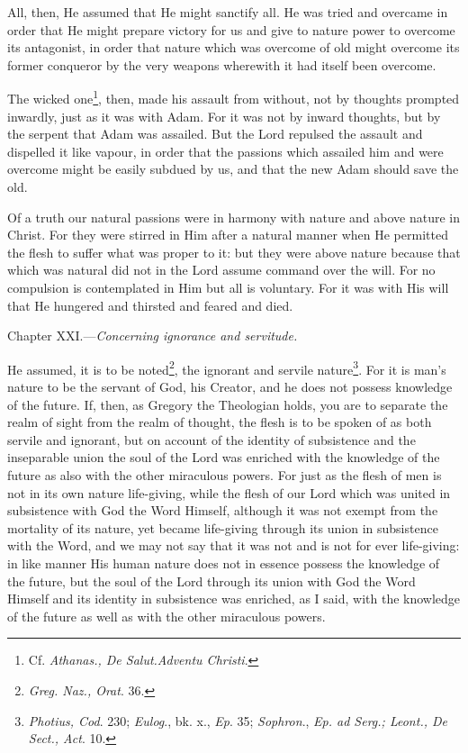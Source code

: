 All, then, He assumed that He might sanctify all. He was tried and overcame in order that He might prepare victory for us and give to nature power to overcome its antagonist, in order that nature which was overcome of old might overcome its former conqueror by the very weapons wherewith it had itself been overcome.

The wicked one\footnote{Cf. \emph{Athanas., De Salut.Adventu Christi}.}, then, made his assault from without, not by thoughts prompted inwardly, just as it was with Adam. For it was not by inward thoughts, but by the serpent that Adam was assailed. But the Lord repulsed the assault and dispelled it like vapour, in order that the passions which assailed him and were overcome might be easily subdued by us, and that the new Adam should save the old.

Of a truth our natural passions were in harmony with nature and above nature in Christ. For they were stirred in Him after a natural manner when He permitted the flesh to suffer what was proper to it: but they were above nature because that which was natural did not in the Lord assume command over the will. For no compulsion is contemplated in Him but all is voluntary. For it was with His will that He hungered and thirsted and feared and died.


Chapter XXI.—\emph{Concerning ignorance and servitude.}

He assumed, it is to be noted\footnote{\emph{Greg. Naz., Orat}. 36.}, the ignorant and servile nature\footnote{\emph{Photius, Cod}. 230; \emph{Eulog}., bk. x., \emph{Ep}. 35; \emph{Sophron}., \emph{Ep. ad Serg.; Leont., De Sect., Act}. 10.}. For it is man’s nature to be the servant of God, his Creator, and he does not possess knowledge of the future. If, then, as Gregory the Theologian holds, you are to separate the realm of sight from the realm of thought, the flesh is to be spoken of as both servile and ignorant, but on account of the identity of subsistence and the inseparable union the soul of the Lord was enriched with the knowledge of the future as also with the other miraculous powers. For just as the flesh of men is not in its own nature life-giving, while the flesh of our Lord which was united in subsistence with God the Word Himself, although it was not exempt from the mortality of its nature, yet became life-giving through its union in subsistence with the Word, and we may not say that it was not and is not for ever life-giving: in like manner His human nature does not in essence possess the knowledge of the future, but the soul of the Lord through its union with God the Word Himself and its identity in subsistence was enriched, as I said, with the knowledge of the future as well as with the other miraculous powers.

